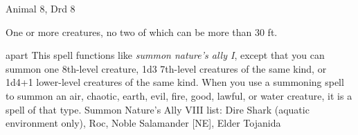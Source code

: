 
\begin{description*}
\item[Level:] Animal 8, Drd 8
\item[Effect:] One or more creatures, no two of which can be more than 30 ft.
\end{description*}

apart
This spell functions like \textit{summon nature's ally I}, except that you can
summon one 8th-level creature, 1d3 7th-level creatures of the same kind, or 1d4+1
lower-level creatures of the same kind.
When you use a summoning spell to summon an air, chaotic, earth, evil, fire, good,
lawful, or water creature, it is a spell of that type.
Summon Nature's Ally VIII list: Dire Shark (aquatic environment only), Roc, Noble Salamander [NE], Elder Tojanida